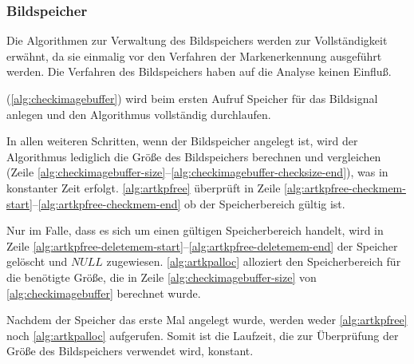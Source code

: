 \subsubsection{Bildspeicher} %
\label{sub:artoolkitplus-bildspeicher}

Die Algorithmen zur Verwaltung des Bildspeichers werden zur Vollständigkeit erwähnt, da sie einmalig vor den Verfahren
 der Markenerkennung ausgeführt werden. Die Verfahren des Bildspeichers haben auf die Analyse keinen Einfluß.

 (\autoref{alg:checkimagebuffer}) wird beim ersten Aufruf Speicher für das Bildsignal anlegen
 und den Algorithmus vollständig durchlaufen.

In allen weiteren Schritten, wenn der Bildspeicher angelegt ist, wird der Algorithmus lediglich die Größe des
 Bildspeichers berechnen und vergleichen
(Zeile \ref{alg:checkimagebuffer-size}--\ref{alg:checkimagebuffer-checksize-end}), was in konstanter Zeit erfolgt.
\autoref{alg:artkpfree} überprüft in Zeile \ref{alg:artkpfree-checkmem-start}--\ref{alg:artkpfree-checkmem-end} ob der
 Speicherbereich gültig ist.

Nur im Falle, dass es sich um einen gültigen Speicherbereich handelt, wird in Zeile
 \ref{alg:artkpfree-deletemem-start}--\ref{alg:artkpfree-deletemem-end} der Speicher gelöscht und $\mathit{NULL}$
 zugewiesen. \autoref{alg:artkpalloc} alloziert den Speicherbereich für die benötigte Größe, die in Zeile
 \ref{alg:checkimagebuffer-size} von \autoref{alg:checkimagebuffer} berechnet wurde.

Nachdem der Speicher das erste Mal angelegt wurde, werden weder \autoref{alg:artkpfree} noch \autoref{alg:artkpalloc}
 aufgerufen. Somit ist die Laufzeit, die zur Überprüfung der Größe des Bildspeichers verwendet wird, konstant.
